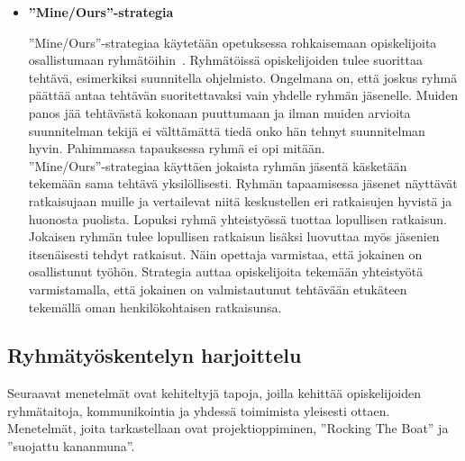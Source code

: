 \documentclass[finnish]{../tktltiki2}
\theoremstyle{definition}
\theoremstyle{remark}
\begin{document}
\begin{itemize}
\pagebreak

\item {\bf ''Mine/Ours''-strategia}

''Mine/Ours''-strategiaa käytetään opetuksessa rohkaisemaan
opiskelijoita osallistumaan ryhmätöihin~\cite{1158709}. Ryhmätöissä opiskelijoiden tulee suorittaa tehtävä, esimerkiksi suunnitella ohjelmisto. Ongelmana on, että joskus ryhmä päättää antaa tehtävän suoritettavaksi vain yhdelle ryhmän jäsenelle. Muiden panos jää tehtävästä kokonaan puuttumaan ja ilman muiden arvioita suunnitelman tekijä ei välttämättä tiedä onko hän tehnyt suunnitelman hyvin. Pahimmassa tapauksessa ryhmä ei opi mitään.\\

''Mine/Ours''-strategiaa käyttäen jokaista ryhmän jäsentä käsketään tekemään sama tehtävä yksilöllisesti. Ryhmän tapaamisessa jäsenet näyttävät ratkaisujaan muille ja vertailevat niitä keskustellen eri ratkaisujen hyvistä ja huonosta puolista. Lopuksi ryhmä yhteistyössä tuottaa lopullisen ratkaisun. Jokaisen ryhmän tulee lopullisen ratkaisun lisäksi luovuttaa myös jäsenien itsenäisesti tehdyt ratkaisut. Näin opettaja varmistaa, että jokainen on osallistunut työhön. Strategia auttaa opiskelijoita tekemään yhteistyötä varmistamalla, että jokainen on valmistautunut tehtävään etukäteen tekemällä oman henkilökohtaisen ratkaisunsa. 

\end{itemize}

\subsection{Ryhmätyöskentelyn harjoittelu}

Seuraavat menetelmät ovat kehiteltyjä tapoja, joilla kehittää
opiskelijoiden ryhmätaitoja, kommunikointia ja yhdessä toimimista
yleisesti ottaen. Menetelmät, joita tarkastellaan ovat 
projektioppiminen, ''Rocking The Boat'' ja ''suojattu kananmuna''.
\end{document}

